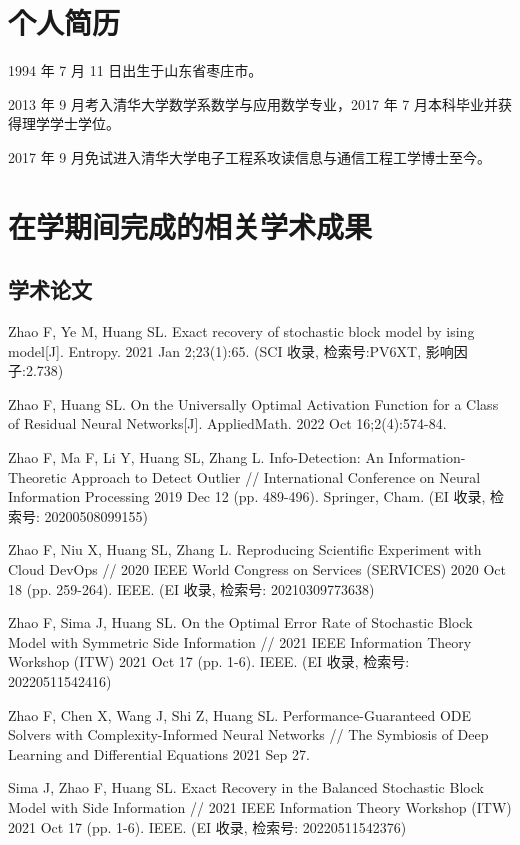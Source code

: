 
\begin{resume}

  \section*{个人简历}

  1994 年 7 月 11 日出生于山东省枣庄市。

  2013 年 9 月考入清华大学数学系数学与应用数学专业，2017 年 7 月本科毕业并获得理学学士学位。

  2017 年 9 月免试进入清华大学电子工程系攻读信息与通信工程工学博士至今。


  \section*{在学期间完成的相关学术成果}

  \subsection*{学术论文}

  \begin{achievements}
    \item Zhao F, Ye M, Huang SL. Exact recovery of stochastic block model by ising model[J]. Entropy. 2021 Jan 2;23(1):65. (SCI 收录, 检索号:PV6XT, 影响因子:2.738)
    \item Zhao F, Huang SL. On the Universally Optimal Activation Function for a Class of Residual Neural Networks[J]. AppliedMath. 2022 Oct 16;2(4):574-84.
    \item Zhao F, Ma F, Li Y, Huang SL, Zhang L. Info-Detection: An Information-Theoretic Approach to Detect Outlier // International Conference on Neural Information Processing 2019 Dec 12 (pp. 489-496). Springer, Cham.
    (EI 收录, 检索号: 20200508099155)
    \item Zhao F, Niu X, Huang SL, Zhang L. Reproducing Scientific Experiment with Cloud DevOps // 2020 IEEE World Congress on Services (SERVICES) 2020 Oct 18 (pp. 259-264). IEEE.
    (EI 收录, 检索号: 20210309773638)
    \item Zhao F, Sima J, Huang SL. On the Optimal Error Rate of Stochastic Block Model with Symmetric Side Information // 2021 IEEE Information Theory Workshop (ITW) 2021 Oct 17 (pp. 1-6). IEEE.
    (EI 收录, 检索号: 20220511542416)
    \item Zhao F, Chen X, Wang J, Shi Z, Huang SL. Performance-Guaranteed ODE Solvers with Complexity-Informed Neural Networks // The Symbiosis of Deep Learning and Differential Equations 2021 Sep 27.
    \item Sima J, Zhao F, Huang SL. Exact Recovery in the Balanced Stochastic Block Model with Side Information // 2021 IEEE Information Theory Workshop (ITW) 2021 Oct 17 (pp. 1-6). IEEE.
    (EI 收录, 检索号: 20220511542376)
  \end{achievements}



\end{resume}
